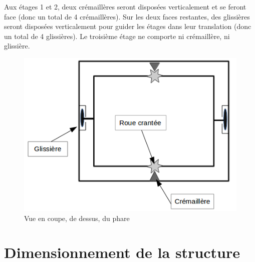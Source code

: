\documentclass{article}
\begin{document}
\pagebreak

Aux étages 1 et 2, deux crémaillères seront disposées verticalement et se feront face (donc un total de 4
crémaillères). Sur les deux faces restantes, des glissières seront disposées verticalement pour guider les
étages dans leur translation (donc un total de 4 glissières). Le troisième étage ne comporte ni crémaillère,
ni glissière.


\begin{figure}[!h]
\centering
\includegraphics[scale=0.7]{Pictures/Schema_phare2.png}
\caption{Vue en coupe, de dessus, du phare}
\end{figure}


\section{Dimensionnement de la structure}
\end{document}
